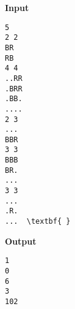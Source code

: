 \textbf{Input }
\begin{verbatim}
5
2 2
BR
RB
4 4
..RR
.BRR
.BB.
....
2 3
...
BBR
3 3
BBB
BR.
...
3 3
...
.R.
...  \textbf{ }\end{verbatim}

\textbf{Output }
\begin{verbatim}
1
0
6
3
102\end{verbatim}